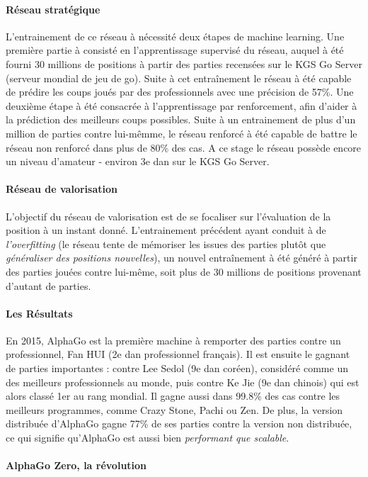 \paragraph{Réseau stratégique} L'entrainement de ce réseau à nécessité deux étapes de machine learning. Une première partie à 
consisté en l'apprentissage supervisé du réseau, auquel à été fourni 30 millions de positions à partir des parties recensées sur 
le KGS Go Server (serveur mondial de jeu de go). Suite à cet entraînement le réseau à été capable de prédire les coups joués par 
des professionnels avec une précision de 57\%. Une deuxième étape à été consacrée à l'apprentissage par renforcement, afin d'aider
à la prédiction des meilleurs coups possibles. Suite à un entrainement de plus d'un million de parties contre lui-mêmme, le réseau
renforcé à été capable de battre le réseau non renforcé dans plus de 80\% des cas. A ce stage le réseau possède encore un niveau
d'amateur - environ 3e dan sur le KGS Go Server. \cite{AlphaGo1}

\paragraph{Réseau de valorisation} L'objectif du réseau de valorisation est de se focaliser sur l'évaluation de la position à un
instant donné. L'entrainement précédent ayant conduit à de \emph{l'overfitting} (le réseau tente de mémoriser les issues des parties
plutôt que \emph{généraliser des positions nouvelles}), un nouvel entraînement à été généré à partir des parties jouées contre
lui-même, soit plus de 30 millions de positions provenant d'autant de parties.

\paragraph{Les Résultats} En 2015, AlphaGo est la première machine à remporter des parties contre un professionnel, Fan HUI (2e dan professionnel
français). Il est ensuite le gagnant de parties importantes : contre Lee Sedol (9e dan coréen), considéré comme un des meilleurs professionnels
au monde, puis contre Ke Jie (9e dan chinois) qui est alors classé 1er au rang mondial. Il gagne aussi dans 99.8\% des cas contre
les meilleurs programmes, comme Crazy Stone, Pachi ou Zen. De plus, la version distribuée d'AlphaGo gagne 77\% de ses parties
contre la version non distribuée, ce qui signifie qu'AlphaGo est aussi bien \emph{performant que scalable}.

\paragraph{AlphaGo Zero, la révolution}

